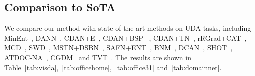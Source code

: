 \documentclass[dvipsnames, svgnames, x11names, table]{article} \usepackage{iclr2022_conference,times}
\begin{document}
\begin{spacing}{1.0}
\subsection{Comparison to SoTA}
We compare our method with state-of-the-art methods on UDA tasks, including MinEnt~\citep{grandvalet2005semi}, 
DANN~\citep{ganin2015unsupervised},  
CDAN+E~\citep{long2017conditional}, CDAN+BSP ~\citep{chen2019transferability}, CDAN+TN~\citep{wang2019transferable}, rRGrad+CAT~\citep{deng2019cluster}, MCD~\citep{saito2018maximum}, SWD~\citep{lee2019sliced}, 
MSTN+DSBN~\citep{chang2019domain}, 
SAFN+ENT~\citep{xu2019larger}, 
BNM~\citep{cui2020towards}, DCAN~\citep{li2020domain}, SHOT~\citep{liang2020we},
ATDOC-NA~\citep{liang2021domain}, CGDM~\citep{du2021cross} and TVT~\citep{yang2021tvt}.
The results are shown in Table~\ref{tab:visda},~\ref{tab:officehome},~\ref{tab:office31} and~\ref{tab:domainnet}. 


\end{spacing}
\end{document}
